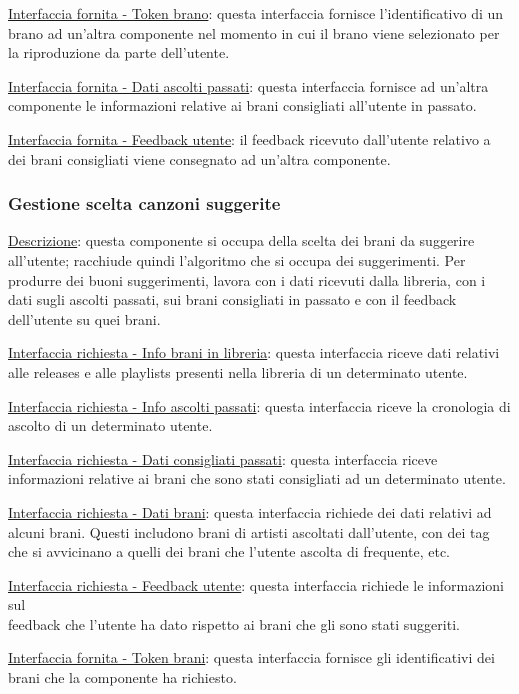 \documentclass[a4paper,12pt]{article}
\begin{document}
\underline{Interfaccia fornita - Token brano}: questa interfaccia fornisce l’identificativo di un brano ad un’altra componente nel momento in cui il brano viene selezionato per la riproduzione da parte dell’utente.

\underline{Interfaccia fornita - Dati ascolti passati}: questa interfaccia fornisce ad un’altra componente le informazioni relative ai brani consigliati all’utente in passato.

\underline{Interfaccia fornita - Feedback utente}: il feedback ricevuto dall’utente relativo a dei brani consigliati viene consegnato ad un’altra componente.

\subsubsection{Gestione scelta canzoni suggerite}

\underline{Descrizione}: questa componente si occupa della scelta dei brani da suggerire all’utente; racchiude quindi l’algoritmo che si occupa dei suggerimenti. Per produrre dei buoni suggerimenti, lavora con i dati ricevuti dalla libreria, con i dati sugli ascolti passati, sui brani consigliati in passato e con il feedback dell’utente su quei brani.

\underline{Interfaccia richiesta - Info brani in libreria}: questa interfaccia riceve dati relativi alle releases e alle playlists presenti nella libreria di un determinato utente.

\underline{Interfaccia richiesta - Info ascolti passati}: questa interfaccia riceve la cronologia di ascolto di un determinato utente.

\underline{Interfaccia richiesta - Dati consigliati passati}: questa interfaccia riceve informazioni relative ai brani che sono stati consigliati ad un determinato utente.

\underline{Interfaccia richiesta - Dati brani}: questa interfaccia richiede dei dati relativi ad alcuni brani. Questi includono brani di artisti ascoltati dall’utente, con dei tag che si avvicinano a quelli dei brani che l’utente ascolta di frequente, etc.

\underline{Interfaccia richiesta - Feedback utente}: questa interfaccia richiede le informazioni sul \\ feedback che l’utente ha dato rispetto ai brani che gli sono stati suggeriti.

\underline{Interfaccia fornita - Token brani}: questa interfaccia fornisce gli identificativi dei brani che la componente ha richiesto.
\end{document}

